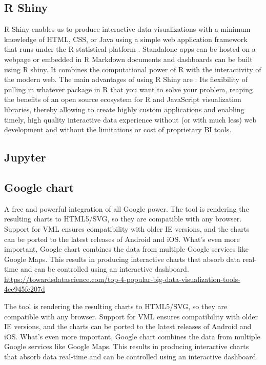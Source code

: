 \documentclass[]{book}
\theoremstyle{definition}
\theoremstyle{definition}
\theoremstyle{definition}
\theoremstyle{remark}
\begin{document}
\subsection{R Shiny}\label{r-shiny}

R Shiny enables us to produce interactive data visualizations with a
minimum knowledge of HTML, CSS, or Java using a simple web application
framework that runs under the R statistical platform
\citep{shiny_interactive_viz}. Standalone apps can be hosted on a
webpage or embedded in R Markdown documents and dashboards can be built
using R shiny. It combines the computational power of R with the
interactivity of the modern web. The main advantages of using R Shiny
are : Its flexibility of pulling in whatever package in R that you want
to solve your problem, reaping the benefits of an open source ecosystem
for R and JavaScript visualization libraries, thereby allowing to create
highly custom applications and enabling timely, high quality interactive
data experience without (or with much less) web development and without
the limitations or cost of proprietary BI tools.

\subsection{Jupyter}\label{jupyter}

\subsection{Google chart}\label{google-chart}

A free and powerful integration of all Google power. The tool is
rendering the resulting charts to HTML5/SVG, so they are compatible with
any browser. Support for VML ensures compatibility with older IE
versions, and the charts can be ported to the latest releases of Android
and iOS. What's even more important, Google chart combines the data from
multiple Google services like Google Maps. This results in producing
interactive charts that absorb data real-time and can be controlled
using an interactive dashboard.
\url{https://towardsdatascience.com/top-4-popular-big-data-visualization-tools-4ee945fe207d}

The tool is rendering the resulting charts to HTML5/SVG, so they are
compatible with any browser. Support for VML ensures compatibility with
older IE versions, and the charts can be ported to the latest releases
of Android and iOS. What's even more important, Google chart combines
the data from multiple Google services like Google Maps. This results in
producing interactive charts that absorb data real-time and can be
controlled using an interactive dashboard. \citep{Top4VizTools}
\end{document}

